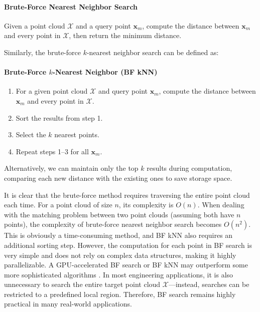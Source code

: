 \begin{mdframed}
	\paragraph{Brute-Force Nearest Neighbor Search}  
	Given a point cloud $\mathcal{X}$ and a query point $\bm{x}_m$, compute the distance between $\bm{x}_m$ and every point in $\mathcal{X}$, then return the minimum distance.  
\end{mdframed}  

Similarly, the brute-force $k$-nearest neighbor search can be defined as:  

\begin{mdframed}
	\paragraph{Brute-Force $k$-Nearest Neighbor (BF kNN)}  
	\begin{enumerate}
		\item For a given point cloud $\mathcal{X}$ and query point $\bm{x}_m$, compute the distance between $\bm{x}_m$ and every point in $\mathcal{X}$.  
		\item Sort the results from step 1.  
		\item Select the $k$ nearest points.  
		\item Repeat steps 1–3 for all $\bm{x}_m$.  
	\end{enumerate}
\end{mdframed}  

Alternatively, we can maintain only the top $k$ results during computation, comparing each new distance with the existing ones to save storage space.  

It is clear that the brute-force method requires traversing the entire point cloud each time. For a point cloud of size $n$, its complexity is $O(n)$. When dealing with the matching problem between two point clouds (assuming both have $n$ points), the complexity of brute-force nearest neighbor search becomes $O(n^2)$. This is obviously a time-consuming method, and BF kNN also requires an additional sorting step. However, the computation for each point in BF search is very simple and does not rely on complex data structures, making it highly parallelizable. A GPU-accelerated BF search or BF kNN may outperform some more sophisticated algorithms \cite{Garcia2008, Li2015}. In most engineering applications, it is also unnecessary to search the entire target point cloud $\mathcal{X}$—instead, searches can be restricted to a predefined local region. Therefore, BF search remains highly practical in many real-world applications.  

